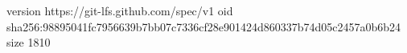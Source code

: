 version https://git-lfs.github.com/spec/v1
oid sha256:98895041fc7956639b7bb07c7336cf28e901424d860337b74d05c2457a0b6b24
size 1810
